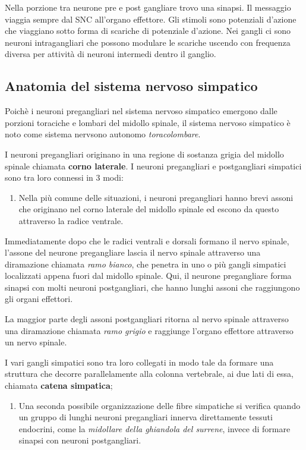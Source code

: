 \documentclass[]{article}
\begin{document}
Nella porzione tra neurone pre e post gangliare trovo una sinapsi. Il
messaggio viaggia sempre dal SNC all'organo effettore. Gli stimoli sono
potenziali d'azione che viaggiano sotto forma di scariche di potenziale
d'azione. Nei gangli ci sono neuroni intragangliari che possono modulare
le scariche uscendo con frequenza diversa per attività di neuroni
intermedi dentro il ganglio.

\subsection{Anatomia del sistema nervoso
simpatico}\label{anatomia-del-sistema-nervoso-simpatico}

Poichè i neuroni pregangliari nel sistema nervoso simpatico emergono
dalle porzioni toraciche e lombari del midollo spinale, il sistema
nervoso simpatico è noto come sistema nervsono autonomo
\emph{toracolombare}.

I neuroni pregangliari originano in una regione di sostanza grigia del
midollo spinale chiamata \textbf{corno laterale}. I neuroni pregangliari
e postgangliari simpatici sono tra loro connessi in 3 modi:

\begin{enumerate}
\def\labelenumi{\arabic{enumi}.}
\itemsep1pt\parskip0pt
\item
  Nella più comune delle situazioni, i neuroni pregangliari hanno brevi
  assoni che originano nel corno laterale del midollo spinale ed escono
  da questo attraverso la radice ventrale.
\end{enumerate}

Immediatamente dopo che le radici ventrali e dorsali formano il nervo
spinale, l'assone del neurone pregangliare lascia il nervo spinale
attraverso una diramazione chiamata \emph{ramo bianco}, che penetra in
uno o più gangli simpatici localizzati appena fuori dal midollo spinale.
Qui, il neurone pregangliare forma sinapsi con molti neuroni
postgangliari, che hanno lunghi assoni che raggiungono gli organi
effettori.

La maggior parte degli assoni postgangliari ritorna al nervo spinale
attraverso una diramazione chiamata \emph{ramo grigio} e raggiunge
l'organo effettore attraverso un nervo spinale.

I vari gangli simpatici sono tra loro collegati in modo tale da formare
una struttura che decorre parallelamente alla colonna vertebrale, ai due
lati di essa, chiamata \textbf{catena simpatica};

\begin{enumerate}
\def\labelenumi{\arabic{enumi}.}
\setcounter{enumi}{1}
\itemsep1pt\parskip0pt
\item
  Una seconda possibile organizzazione delle fibre simpatiche si
  verifica quando un gruppo di lunghi neuroni pregangliari innerva
  direttamente tessuti endocrini, come la \emph{midollare della
  ghiandola del surrene}, invece di formare sinapsi con neuroni
  postgangliari.
\end{enumerate}
\end{document}
